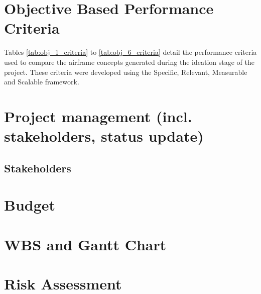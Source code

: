 \clearpage
\begin{flushleft}

\end{flushleft}

\newpage

\begin{appendices}

\section{Objective Based Performance Criteria}
\label{app_performance_criteria}

Tables \ref{tab:obj_1_criteria} to \ref{tab:obj_6_criteria} detail the performance criteria used to compare the airframe concepts generated during the ideation stage of the project. These criteria were developed using the Specific, Relevant, Measurable and Scalable framework.





\section{Project management (incl. stakeholders, status update)}
\subsection{Stakeholders}

\section{Budget}

\clearpage

\section{WBS and Gantt Chart}

\section{Risk Assessment}


\end{appendices}
